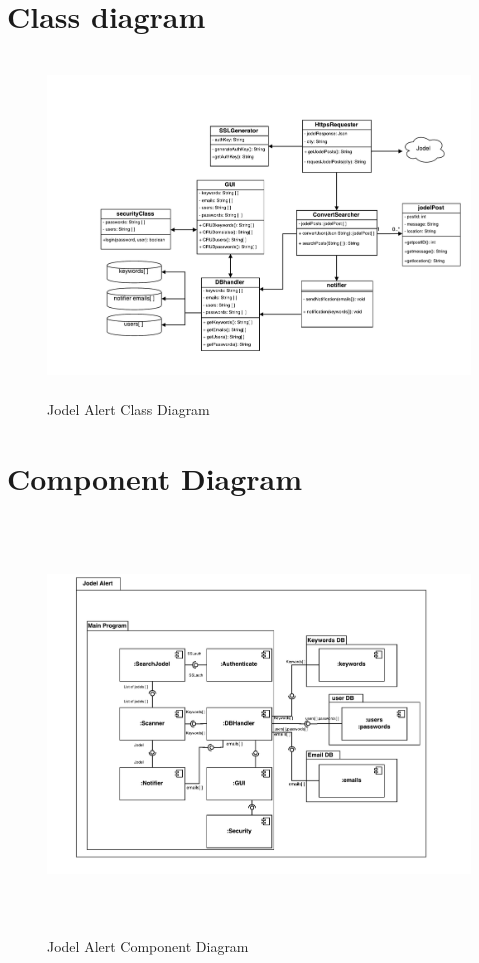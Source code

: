 \documentclass[a4paper,12pt]{article}
\begin{document}
\section{Class diagram}
\begin{figure}[!h]
	\centering
	\includegraphics[height=9cm]{img/jodelUMLClassDiagram.pdf}
	\caption{Jodel Alert Class Diagram}
	\label{Jodel}
\end{figure}
\clearpage
\section{Component Diagram}
\begin{figure}[!h]
	\centering
	\includegraphics[height=11cm]{img/component_diagram.pdf}
	\caption{Jodel Alert Component Diagram}
	\label{Jodel}
\end{figure}
\clearpage
\end{document}
